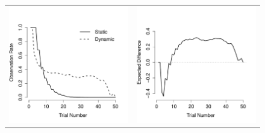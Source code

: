 \documentclass[authoryear]{elsarticle}
\begin{document}
\begin{figure}[t]
\begin{center}
\begin{tabular}{cc}
\includegraphics[scale=0.5]{behaviourOverall.pdf} &
\includegraphics[scale=0.5]{behaviourDifferences.pdf} \\

\end{tabular}
\end{center}
\end{figure}
\end{document}
